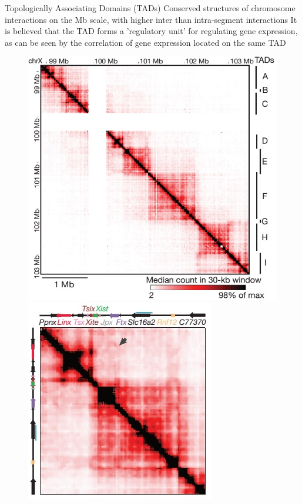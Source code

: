 \documentclass[8pt]{beamer}
\begin{document}
\begin{frame}{Topologically Associating Domains (TADs)}
Conserved structures of chromosome interactions on the Mb scale, with higher inter than intra-segment interactions
It is believed that the TAD forms a 'regulatory unit' for regulating gene expression, as can be seen by the correlation of gene expression located on the same TAD
\centering
\begin{figure}[H]

\includegraphics[scale=0.2]{TADsOfTheXChromosome_NoraEtAl2012}
\quad
\includegraphics[scale=0.25]{TadDandENoraEtAl2012} 

\end{figure}
\end{frame}
\end{document}
